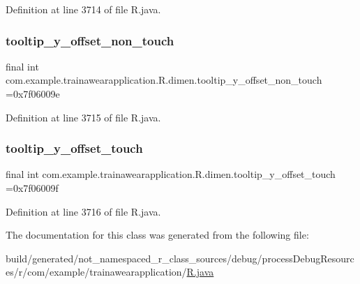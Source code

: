 Definition at line 3714 of file R.\+java.

\mbox{\label{classcom_1_1example_1_1trainawearapplication_1_1_r_1_1dimen_a593c19934fba3183d3b7fb48b85c89b8}} 
\subsubsection{\texorpdfstring{tooltip\_y\_offset\_non\_touch}{tooltip\_y\_offset\_non\_touch}}
{\footnotesize\ttfamily final int com.\+example.\+trainawearapplication.\+R.\+dimen.\+tooltip\+\_\+y\+\_\+offset\+\_\+non\+\_\+touch =0x7f06009e\hspace{0.3cm}{\ttfamily [static]}}



Definition at line 3715 of file R.\+java.

\mbox{\label{classcom_1_1example_1_1trainawearapplication_1_1_r_1_1dimen_ae9166e3eb67facc4394aae9b25003cb9}} 
\subsubsection{\texorpdfstring{tooltip\_y\_offset\_touch}{tooltip\_y\_offset\_touch}}
{\footnotesize\ttfamily final int com.\+example.\+trainawearapplication.\+R.\+dimen.\+tooltip\+\_\+y\+\_\+offset\+\_\+touch =0x7f06009f\hspace{0.3cm}{\ttfamily [static]}}



Definition at line 3716 of file R.\+java.



The documentation for this class was generated from the following file\+:\begin{DoxyCompactItemize}
\item 
build/generated/not\+\_\+namespaced\+\_\+r\+\_\+class\+\_\+sources/debug/process\+Debug\+Resources/r/com/example/trainawearapplication/\mbox{\hyperlink{com_2example_2trainawearapplication_2_r_8java}{R.\+java}}\end{DoxyCompactItemize}
